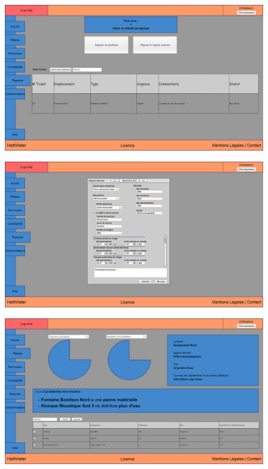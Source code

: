 \documentclass[a4paper, 11pt]{article}
\begin{document}
  \begin{figure}
    \centering
    \includegraphics[width=\textwidth]{Cahier_des_Charges/rapports}
  \end{figure}

  \begin{figure}
    \centering
    \includegraphics[width=\textwidth]{Cahier_des_Charges/rapports_mensuel}
  \end{figure}

  \begin{figure}
    \centering
    \includegraphics[width=\textwidth]{Cahier_des_Charges/reseau}
  \end{figure}
\end{document}

